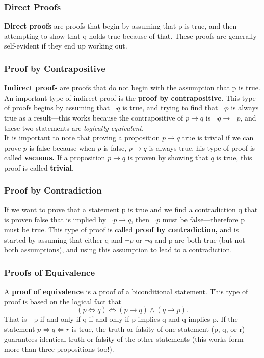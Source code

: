 \documentclass[12pt,letterpaper]{article}
\begin{document}
\subsubsection{Direct Proofs}

\textbf{Direct proofs} are proofs that begin by assuming that p is true, and then attempting to show that q holds true because of that. These proofs are generally self-evident if they end up working out.

\subsubsection{Proof by Contrapositive}

\textbf{Indirect proofs} are proofs that do not begin with the assumption that p is true. An important type of indirect proof is the \textbf{proof by contrapositive}. This type of proofs begins by assuming that $\lnot q$ is true, and trying to find that $\lnot p$ is always true as a result---this works because the contrapositive of $p \rightarrow q$ is $\lnot q \rightarrow \lnot p$, and these two statements are \textit{logically equivalent}. \\

It is important to note that proving a proposition $p \rightarrow q$ true is trivial if we can prove $p$ is false because when $p$ is false, $p \rightarrow q$ is always true. his type of proof is called \textbf{vacuous.} If a proposition $p \rightarrow q$ is proven by showing that $q$ is true, this proof is called \textbf{trivial}.

\subsubsection{Proof by Contradiction}

If we want to prove that a statement p is true and we find a contradiction q that is proven false that is implied by $\lnot p \rightarrow q$, then $\lnot p$ must be false---therefore p must be true. This type of proof is called \textbf{proof by contradiction,} and is started by assuming that either q and $\lnot p$ or $\lnot q$ and p are both true (but not both assumptions), and using this assumption to lead to a contradiction.

\subsubsection{Proofs of Equivalence}

A \textbf{proof of equivalence} is a proof of a biconditional statement. This type of proof is based on the logical fact that $$(p \iff q) \iff (p \rightarrow q)\wedge(q \rightarrow p).$$ That is---p if and only if q if and only if p implies q and q implies p. If the statement $p \iff q \iff r$ is true, the truth or falsity of one statement (p, q, or r) guarantees identical truth or falsity of the other statements (this works form more than three propositions too!).
\end{document}
